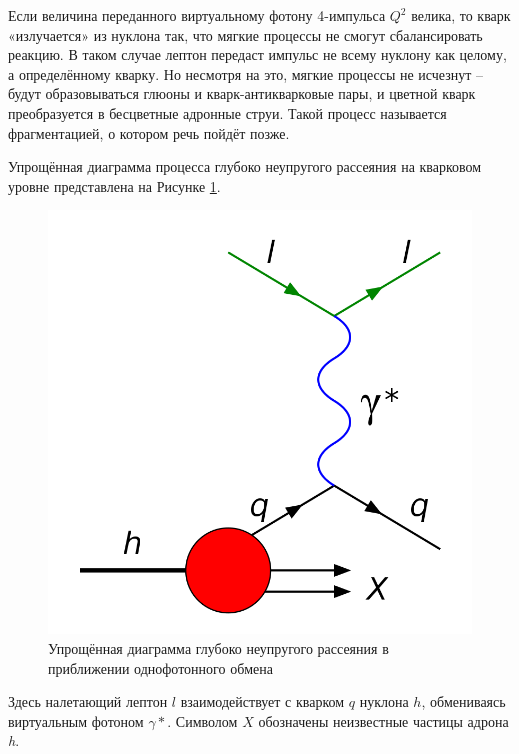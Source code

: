 \documentclass{extarticle}
\begin{document}
Если величина переданного виртуальному фотону 4-импульса $Q^2$ велика, то кварк «излучается» из нуклона так, что мягкие процессы не смогут сбалансировать реакцию. В таком случае лептон передаст импульс не всему нуклону как целому, а определённому кварку. Но несмотря на это, мягкие процессы не исчезнут – будут образовываться глюоны и кварк-антикварковые пары, и цветной кварк преобразуется в бесцветные адронные струи. Такой процесс называется фрагментацией, о котором речь пойдёт позже.

Упрощённая диаграмма процесса глубоко неупругого рассеяния на кварковом уровне представлена на Рисунке \ref{fig:DIS}.


\begin{figure}[h]
    \centering
    \includegraphics[width = 0.7\linewidth]{DIS.png}
    \caption{Упрощённая диаграмма глубоко неупругого рассеяния в приближении однофотонного обмена}
    \label{fig:DIS}
\end{figure}

Здесь налетающий лептон $l$ взаимодействует с кварком $q$ нуклона $h$, обмениваясь виртуальным фотоном $\gamma*$. Символом $X$ обозначены неизвестные частицы адрона \textit{h}.
\end{document}
